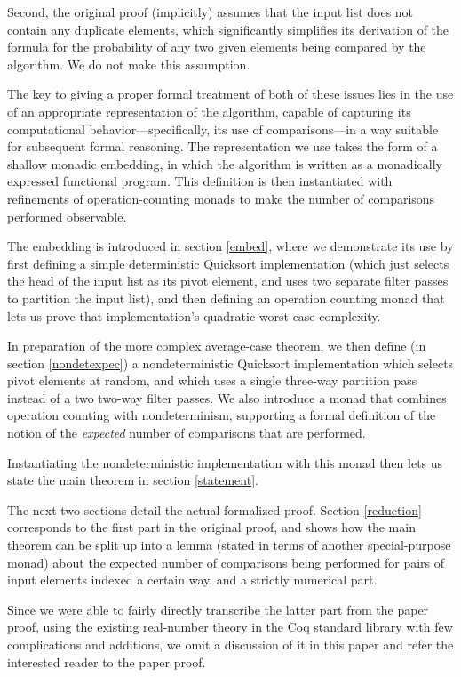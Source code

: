\documentclass[runningheads]{llncs}
\begin{document}
Second, the original proof (implicitly) assumes that the input list does not contain any duplicate elements, which significantly simplifies its derivation of the formula for the probability of any two given elements being compared by the algorithm. We do not make this assumption.

The key to giving a proper formal treatment of both of these issues lies in the use of an appropriate representation of the algorithm, capable of capturing its computational behavior---specifically, its use of comparisons---in a way suitable for subsequent formal reasoning. The representation we use takes the form of a shallow monadic embedding, in which the algorithm is written as a monadically expressed functional program. This definition is then instantiated with refinements of operation-counting monads to make the number of comparisons performed observable.

The embedding is introduced in section \ref{embed}, where we demonstrate its use by first defining a simple deterministic Quicksort implementation (which just selects the head of the input list as its pivot element, and uses two separate filter passes to partition the input list), and then defining an operation counting monad that lets us prove that implementation's quadratic worst-case complexity.

In preparation of the more complex average-case theorem, we then define (in section \ref{nondetexpec}) a nondeterministic Quicksort implementation which selects pivot elements at random, and which uses a single three-way partition pass instead of a two two-way filter passes. We also introduce a monad that combines operation counting with nondeterminism, supporting a formal definition of the notion of the \emph{expected} number of comparisons that are performed.

Instantiating the nondeterministic implementation with this monad then lets us state the main theorem in section \ref{statement}.

The next two sections detail the actual formalized proof. Section \ref{reduction} corresponds to the first part in the original proof, and shows how the main theorem can be split up into a lemma (stated in terms of another special-purpose monad) about the expected number of comparisons being performed for pairs of input elements indexed a certain way, and a strictly numerical part.

Since we were able to fairly directly transcribe the latter part from the paper proof, using the existing real-number theory in the Coq standard library with few complications and additions, we omit a discussion of it in this paper and refer the interested reader to the paper proof.
\end{document}
